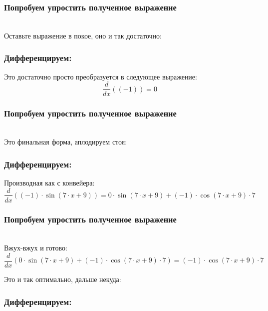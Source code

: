 \documentclass[a4paper,12pt]{article}
\begin{document}
\subsubsection*{Попробуем упростить полученное выражение}
\\Оставьте выражение в покое, оно и так достаточно:

\subsubsection*{Дифференцируем:}

Это достаточно просто преобразуется в следующее выражение:
\begin{dmath}\frac{d}{dx}\left((-1)\right)=0\end{dmath}
\subsubsection*{Попробуем упростить полученное выражение}
\\Это финальная форма, аплодируем стоя:

\subsubsection*{Дифференцируем:}

Производная как с конвейера:
\begin{dmath}\frac{d}{dx}\left((-1)\cdot \operatorname{sin}\left(7\cdot x+ 9\right) \right)=0\cdot \operatorname{sin}\left(7\cdot x+ 9\right) + (-1)\cdot \operatorname{cos}\left(7\cdot x+ 9\right) \cdot 7\end{dmath}
\subsubsection*{Попробуем упростить полученное выражение}
\\Вжух-вжух и готово:\\
\begin{dmath}
	\frac{d}{dx}\left(0\cdot \operatorname{sin}\left(7\cdot x+ 9\right) + (-1)\cdot \operatorname{cos}\left(7\cdot x+ 9\right) \cdot 7\right) = (-1)\cdot \operatorname{cos}\left(7\cdot x+ 9\right) \cdot 7\end{dmath}

Это и так оптимально, дальше некуда:

\subsubsection*{Дифференцируем:}
\end{document}
